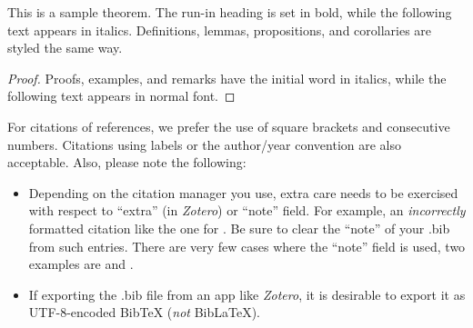 \documentclass[runningheads]{llncs}
\begin{document}
\begin{theorem}
	This is a sample theorem. The run-in heading is set in bold, while
	the following text appears in italics. Definitions, lemmas,
	propositions, and corollaries are styled the same way.
\end{theorem}
%
%
\begin{proof}
	Proofs, examples, and remarks have the initial word in italics,
	while the following text appears in normal font.
\end{proof}
For citations of references, we prefer the use of square brackets
and consecutive numbers. Citations using labels or the author/year
convention are also acceptable.
Also, please note the following:
\begin{itemize}
	\item Depending on the citation manager you use, extra care needs to be exercised with respect to ``extra'' (in \textit{Zotero}) or ``note'' field.
    For example,
    an \textit{incorrectly} formatted citation like the one for \cite{sankoff_formal_1981}.
    Be sure to clear the ``note'' of your .bib from such entries.
    There are very few cases where the ``note'' field is used,
    two examples are \cite{ozernyi_linguistic_2022} and \cite{ozernyi_rise_2022}.
	\item If exporting the .bib file from an app like \textit{Zotero}, it is desirable to export it as UTF-8-encoded BibTeX (\textit{not} BibLaTeX).
\end{itemize}
%
%
%


%




\end{document}
